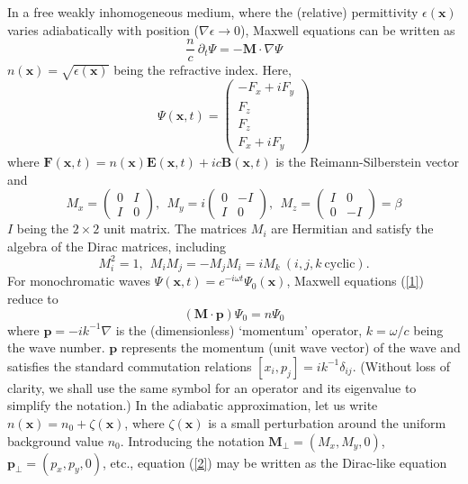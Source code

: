 \documentclass[aps,pra,preprint,superscriptaddress,showpacs,showkeys]{revtex4}
\begin{document}
In a free weakly inhomogeneous medium, where the (relative) permittivity $\epsilon(\textbf{x})$ varies adiabatically with position ($\nabla\epsilon \rightarrow 0$), Maxwell equations can be written as \cite{Khan}
\begin{equation}
\frac{n}{c}\:\partial_t\Psi=-\textbf{M}\cdot\nabla \Psi \label{1}
\end{equation}
$n(\textbf{x})=\surd {\epsilon(\textbf{x})}$ being the refractive index. Here,
\begin{equation}
\Psi(\textbf{x},t)=\left( \begin{array}{c}-F_{x}+iF_{y}\\ F_{z}\\ F_{z}\\F_{x}+ iF_{y} \end{array} \right) \label{0} 
\end{equation}
where $\textbf{F} (\textbf{x},t)=n(\textbf{x})\textbf{E}(\textbf{x},t) +ic \textbf{B}(\textbf{x},t)$ is the Reimann-Silberstein vector and
\begin{equation}
M_{x}=\left( \begin{array}{cc}0&I\\I&0\end{array} \right), \ \
M_{y}=i\left( \begin{array}{cc}0&-I\\I&0\end{array} \right),\ \
M_{z}=\left( \begin{array}{cc}I&0\\0&-I\end{array} \right)=\beta \label{3}
\end{equation}
$I$ being the $2\times2$ unit matrix. The matrices $M_i$ are Hermitian and satisfy the algebra of the Dirac matrices, including
\begin{equation}
M_i^2=1, \ \ M_iM_j=-M_jM_i=iM_k \ (i,j,k\ \text{cyclic}). \label{a}
\end{equation}
For monochromatic waves $\Psi(\textbf{x},t)=e^{-i\omega t}\Psi_0(\textbf{x})$, Maxwell equations (\ref{1}) reduce to
\begin{equation}
(\textbf{M}\cdot\textbf{p})\Psi_0=n \Psi_0 \label{2}
\end{equation}
where $\textbf{p}=-ik^{-1}\nabla$ is the (dimensionless) `momentum' operator, $k=\omega/c$ being the wave number. $\textbf{p}$ represents the momentum (unit wave vector) of the wave and satisfies the standard commutation relations $[x_i,p_j]=ik^{-1}\delta_{ij}$. (Without loss of clarity, we shall use the same symbol for an operator and its eigenvalue to simplify the notation.) In the adiabatic approximation, let us write $n(\textbf{x})=n_0+\zeta(\textbf{x})$, where $\zeta(\textbf{x})$ is a small perturbation around the uniform background value $n_0$. Introducing the notation $\textbf{M}_\bot=(M_x,M_y,0)$, $\textbf{p}_\bot=(p_x,p_y,0)$, etc., equation (\ref{2}) may be written as the Dirac-like equation
\end{document}
